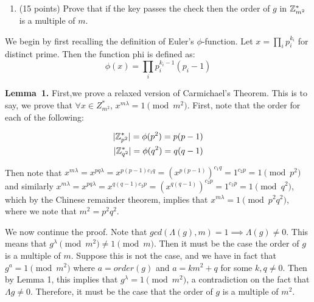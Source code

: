 \documentclass{article}
\begin{document}
\begin{enumerate}
\begin{itemize}
\begin{enumerate}[noitemsep,topsep=\mdcompacttopsep,label=\alph*.]
\item{}(15 points) Prove that if the key passes the check then the order of $g$ in $\mathbb{Z}^*_{m^2}$ is a multiple of $m$.%
\end{enumerate}%

We begin by first recalling the definition of Euler's $\phi$-function. Let $x = \prod_i p_i^{k_i}$
for distinct prime. Then the function phi is defined as:%
\noindent\noindent\[%
\phi(x) = \prod_{i} p_i^{k_i - 1}(p_i - 1)
\]%

\begin{mdbmarginx}{1ex}{0pt}{1ex}{0pt}%
\noindent{}\textbf{Lemma~1.} \mdbr
{}First,we prove a relaxed version of Carmichael's Theorem. This is to say, we prove that $\forall x \in Z_{m^2}^*$,
$x^{m\lambda} = 1 \pmod {m^2}$. First, note that the order for each of the following:%
\end{mdbmarginx}%
\noindent\noindent\[%
\begin{aligned}
   |\Z_{p^2}^*| = \phi(p^2) = p(p-1) \\
   |\Z_{q^2}^*| = \phi(q^2) = q(q-1)
\end{aligned}
\]%

Then note that $x^{m\lambda} = x^{pq\lambda} = x^{p(p-1)c_1q} = (x^{p(p-1)})^{c_1q} = 1^{c_2p} = 1 \pmod {p^2}$ and similarly $x^{m \lambda} =x^{pq\lambda} = x^{q(q-1)c_2p} = (x^{q(q-1)})^{c_2p} = 1^{c_2p} = 1 \pmod {q^2}$, which by the Chinese remainder theorem, implies that
$x^{m\lambda} = 1 \pmod {p^2q^2}$, where we note that $m^2 = p^2q^2$.%

We now continue the proof. Note that $gcd(\Lambda(g), m) = 1 \implies \Lambda(g) \neq 0$. This
means that $g^{\lambda} \pmod {m^2} \neq 1 \pmod{m}$. Then it must be the case the order of $g$
is a multiple of $m$. Suppose this is not the case, and we have in fact that $g^a = 1 \pmod {m^2}$
where $a = order(g)$ and $a = km^2 + q$ for some $k,q \neq 0$. Then by Lemma 1, this implies that 
$g^{\lambda} =1 \pmod {m^2}$, a contradiction on the fact that $\Lambda{g} \neq 0$. Therefore, it must be the case that the order of $g$ is a multiple of $m^2$.%


\end{itemize}
\end{enumerate}
\end{document}

